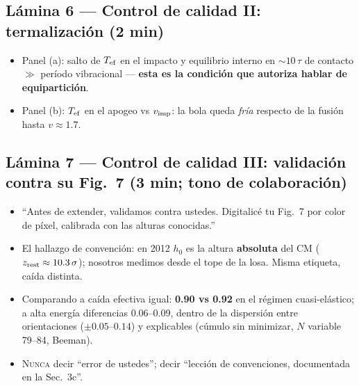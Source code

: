 \documentclass[11pt]{article}
\newcommand{\clave}[1]{\textcolor{red!60!black}{\textbf{#1}}}
\begin{document}
\subsection*{Lámina 6 --- Control de calidad II: termalización (2 min)}
\begin{itemize}[leftmargin=1.4em]
    \item Panel (a): salto de $T_{\rm ef}$ en el impacto y equilibrio
    interno en $\sim10\,\tau$ de contacto $\gg$ período vibracional ---
    \clave{esta es la condición que autoriza hablar de equipartición}.
    \item Panel (b): $T_{\rm ef}$ en el apogeo vs $v_{\rm imp}$: la bola
    queda \emph{fría} respecto de la fusión hasta $v\approx1.7$.
\end{itemize}

\subsection*{Lámina 7 --- Control de calidad III: validación contra su
Fig.~7 (3 min; tono de colaboración)}
\begin{itemize}[leftmargin=1.4em]
    \item ``Antes de extender, validamos contra ustedes. Digitalicé tu
    Fig.~7 por color de píxel, calibrada con las alturas conocidas.''
    \item El hallazgo de convención: en 2012 $h_0$ es la altura
    \clave{absoluta} del CM ($z_{\rm rest}\approx10.3\,\sigma$); nosotros
    medimos desde el tope de la losa. Misma etiqueta, caída distinta.
    \item Comparando a caída efectiva igual: \clave{0.90 vs 0.92} en el
    régimen cuasi-elástico; a alta energía diferencias 0.06--0.09,
    dentro de la dispersión entre orientaciones ($\pm0.05$--$0.14$) y
    explicables (cúmulo sin minimizar, $N$ variable 79--84, Beeman).
    \item \textsc{Nunca} decir ``error de ustedes''; decir ``lección de
    convenciones, documentada en la Sec.~3c''.
\end{itemize}
\end{document}
